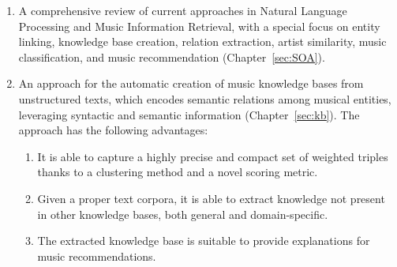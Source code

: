 \begin{enumerate}

\item 
A comprehensive review of current approaches in Natural Language Processing and Music Information Retrieval, with a special focus on entity linking, knowledge base creation, relation extraction, artist similarity, music classification, and music recommendation (Chapter~\ref{sec:SOA}).


\item 
An approach for the automatic creation of music knowledge bases from unstructured texts, which encodes semantic relations among musical entities, leveraging syntactic and semantic information (Chapter~\ref{sec:kb}). %
The approach has the following advantages:

\begin{enumerate}
\item 
It is able to capture a highly precise and compact set of weighted triples thanks to a clustering method and a novel scoring metric. 
\item 
Given a proper text corpora, it is able to extract knowledge not present in other knowledge bases, both general and domain-specific. 
\item
The extracted knowledge base is suitable to provide explanations for music recommendations.
\end{enumerate}


\end{enumerate}
